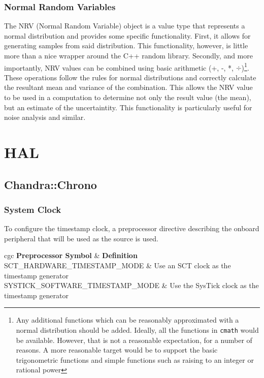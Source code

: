 \documentclass[10pt,letterpaper]{memoir} %
\begin{document}
\subsubsection{Normal Random Variables}
The NRV (Normal Random Variable) object is a value type that represents a normal distribution and provides some specific functionality.  First, it allows for generating samples from said distribution.  This functionality, however, is little more than a nice wrapper around the C++ random library.  Secondly, and more importantly, NRV values can be combined using basic arithmetic (+, -, *, $\div$)\footnote{Any additional functions which can be reasonably approximated with a normal distribution should be added.  Ideally, all the functions in \texttt{cmath} would be available.  However, that is not a reasonable expectation, for a number of reasons.  A more reasonable target would be to support the basic trigonometric functions and simple functions such as raising to an integer or rational power}.  These operations follow the rules for normal distributions and correctly calculate the resultant mean and variance of the combination.  This allows the NRV value to be used in a computation to determine not only the result value (the mean), but an estimate of the uncertaintity.  This functionality is particularly useful for noise analysis and similar. 

\section{HAL}
\subsection{Chandra::Chrono}
\subsubsection{System Clock}
To configure the timestamp clock, a preprocessor directive describing the onboard peripheral that will be used as the source is used. \\
	\begin{centering}
	\begin{tabular}{cgc}
		\textbf{Preprocessor Symbol}  & \textbf{Definition}\\
		SCT\_HARDWARE\_TIMESTAMP\_MODE & Use an SCT clock as the timestamp generator\\
		SYSTICK\_SOFTWARE\_TIMESTAMP\_MODE & Use the SysTick clock as the timestamp generator\\
		
	\end{tabular}
	\end{centering}
\end{document}
